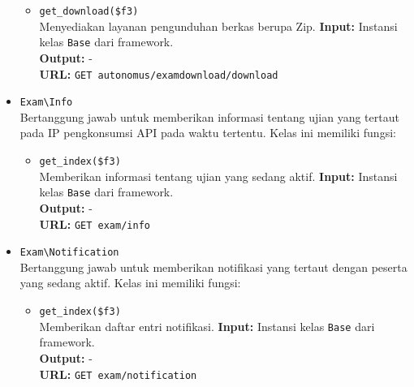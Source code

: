 \begin{itemize}
\begin{itemize}
                \item \texttt{get\_download(\$f3)} \\
                    Menyediakan layanan pengunduhan berkas berupa Zip.
                    \textbf{Input:} Instansi kelas \texttt{Base} dari
                    framework.\\
                    \textbf{Output:} -\\
                    \textbf{URL:} \texttt{GET autonomus/examdownload/download}
            \end{itemize}
            
        \item \texttt{Exam\textbackslash Info} \\
            Bertanggung jawab untuk memberikan informasi tentang ujian yang
            tertaut pada IP pengkonsumsi API pada waktu tertentu. Kelas ini
            memiliki fungsi:
            \begin{itemize}
                \item \texttt{get\_index(\$f3)} \\
                    Memberikan informasi tentang ujian yang sedang aktif.
                    \textbf{Input:} Instansi kelas \texttt{Base} dari
                    framework.\\
                    \textbf{Output:} - \\
                    \textbf{URL:} \texttt{GET exam/info}
            \end{itemize}
            
        \item \texttt{Exam\textbackslash Notification} \\
            Bertanggung jawab untuk memberikan notifikasi yang tertaut dengan
            peserta yang sedang aktif. Kelas ini memiliki fungsi:
            \begin{itemize}
                \item \texttt{get\_index(\$f3)} \\
                    Memberikan daftar entri notifikasi. \textbf{Input:} Instansi
                    kelas \texttt{Base} dari framework.\\
                    \textbf{Output:} -\\
                    \textbf{URL:} \texttt{GET exam/notification}
            \end{itemize}
            

\end{itemize}
